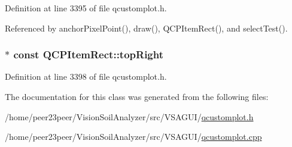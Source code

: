 Definition at line 3395 of file qcustomplot.\+h.



Referenced by anchor\+Pixel\+Point(), draw(), Q\+C\+P\+Item\+Rect(), and select\+Test().

\hypertarget{class_q_c_p_item_rect_a77e0eb6e4aa6efee620d35e2c21bdad7}{}
\subsubsection[{top\+Right}]{$\ast$ const Q\+C\+P\+Item\+Rect\+::top\+Right}\label{class_q_c_p_item_rect_a77e0eb6e4aa6efee620d35e2c21bdad7}


Definition at line 3398 of file qcustomplot.\+h.



The documentation for this class was generated from the following files\+:\begin{DoxyCompactItemize}
\item 
/home/peer23peer/\+Vision\+Soil\+Analyzer/src/\+V\+S\+A\+G\+U\+I/\hyperlink{qcustomplot_8h}{qcustomplot.\+h}\item 
/home/peer23peer/\+Vision\+Soil\+Analyzer/src/\+V\+S\+A\+G\+U\+I/\hyperlink{qcustomplot_8cpp}{qcustomplot.\+cpp}\end{DoxyCompactItemize}
